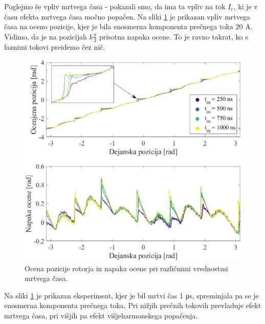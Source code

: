 \documentclass[a4paper,twoside,openright,12pt,slovene]{book}
\begin{document}
Poglejmo še vpliv mrtvega časa - pokazali smo, da ima ta vpliv na tok $I_e$, ki je v času efekta mrtvega časa močno popačen. Na sliki \ref{vsiljenaPozicijaMrtviCasPlot_angleError} je prikazan vpliv
mrtvega časa na oceno pozicije, kjer je bila enosmerna komponenta prečnega toka 20 A. Vidimo, da je na pozicijah $k\frac{\pi}{3}$ prisotna napaka ocene. To je ravno takrat, ko s faznimi tokovi
preidemo čez nič.

\begin{figure}[!htbp]
    \centering
    \includegraphics[width=1.05\columnwidth]{Slike/vsiljenaPozicijaMrtviCasPlot_angleError.eps}
    \caption{\label{vsiljenaPozicijaMrtviCasPlot_angleError} Ocena pozicije rotorja in napaka ocene pri različnimi vrednostmi mrtvega časa. }
\end{figure}

\newpage

Na sliki \ref{vsiljenaPozicijaMrtviCasPlot_angleError} je prikazan eksperiment, kjer je bil mrtvi čas 1 μs, spreminjala pa se je enosmerna komponenta prečnega toka. Pri nižjih prečnih tokovih
prevladuje efekt mrtvega časa, pri višjih pa efekt višjeharmonskega popačenja.
\end{document}
